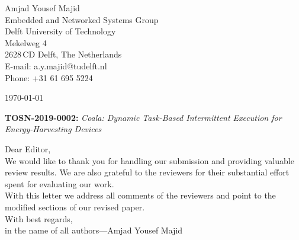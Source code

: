 \documentclass[10pt]{article}
\begin{document}
\pagestyle{myheadings}
\thispagestyle{empty}


\headsep 0.5cm

\bigskip\bigskip


\bigskip\bigskip

\begin{flushright}
Amjad Yousef Majid \\
Embedded and Networked Systems Group \\ 
Delft University of Technology \\ 
Mekelweg 4\\
2628\,CD Delft, The Netherlands \\
E-mail: a.y.majid@tudelft.nl\\
Phone: +31 61 695 5224\\
\end{flushright}

\vspace*{2cm}

\today
\medskip


\textbf{TOSN-2019-0002:} {\sl Coala: Dynamic Task-Based Intermittent Execution for Energy-Harvesting Devices}

\bigskip

Dear Editor,\\

We would like to thank you for handling our submission and providing valuable review results. 
We are also grateful to the reviewers for their substantial effort spent for evaluating our work. \\

With this letter we address all comments of the reviewers and point to the modified sections of our revised paper. \\

With best regards, \\

in the name of all authors---Amjad Yousef Majid

\pagebreak
\end{document}
